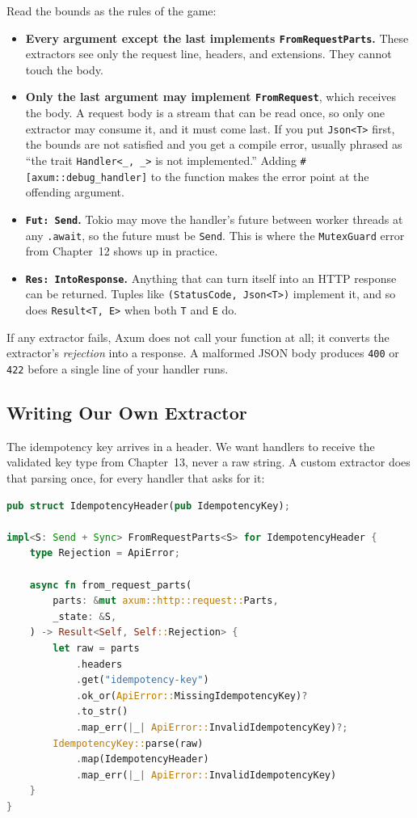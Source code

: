 Read the bounds as the rules of the game:
\begin{itemize}
  \item \textbf{Every argument except the last implements \texttt{FromRequestParts}.} These extractors see only the request line, headers, and extensions. They cannot touch the body.
  \item \textbf{Only the last argument may implement \texttt{FromRequest}}, which receives the body. A request body is a stream that can be read once, so only one extractor may consume it, and it must come last. If you put \texttt{Json<T>} first, the bounds are not satisfied and you get a compile error, usually phrased as ``the trait \texttt{Handler<\_, \_>} is not implemented.'' Adding \texttt{\#[axum::debug\_handler]} to the function makes the error point at the offending argument.
  \item \textbf{\texttt{Fut: Send}.} Tokio may move the handler's future between worker threads at any \texttt{.await}, so the future must be \texttt{Send}. This is where the \texttt{MutexGuard} error from Chapter~12 shows up in practice.
  \item \textbf{\texttt{Res: IntoResponse}.} Anything that can turn itself into an HTTP response can be returned. Tuples like \texttt{(StatusCode, Json<T>)} implement it, and so does \texttt{Result<T, E>} when both \texttt{T} and \texttt{E} do.
\end{itemize}
If any extractor fails, Axum does not call your function at all; it converts the extractor's \emph{rejection} into a response. A malformed JSON body produces \texttt{400} or \texttt{422} before a single line of your handler runs.

\subsection{Writing Our Own Extractor}

The idempotency key arrives in a header. We want handlers to receive the validated key type from Chapter~13, never a raw string. A custom extractor does that parsing once, for every handler that asks for it:

\begin{lstlisting}[language=Rust, caption={A custom FromRequestParts extractor that parses and validates the Idempotency-Key header.}]
pub struct IdempotencyHeader(pub IdempotencyKey);

impl<S: Send + Sync> FromRequestParts<S> for IdempotencyHeader {
    type Rejection = ApiError;

    async fn from_request_parts(
        parts: &mut axum::http::request::Parts,
        _state: &S,
    ) -> Result<Self, Self::Rejection> {
        let raw = parts
            .headers
            .get("idempotency-key")
            .ok_or(ApiError::MissingIdempotencyKey)?
            .to_str()
            .map_err(|_| ApiError::InvalidIdempotencyKey)?;
        IdempotencyKey::parse(raw)
            .map(IdempotencyHeader)
            .map_err(|_| ApiError::InvalidIdempotencyKey)
    }
}
\end{lstlisting}

